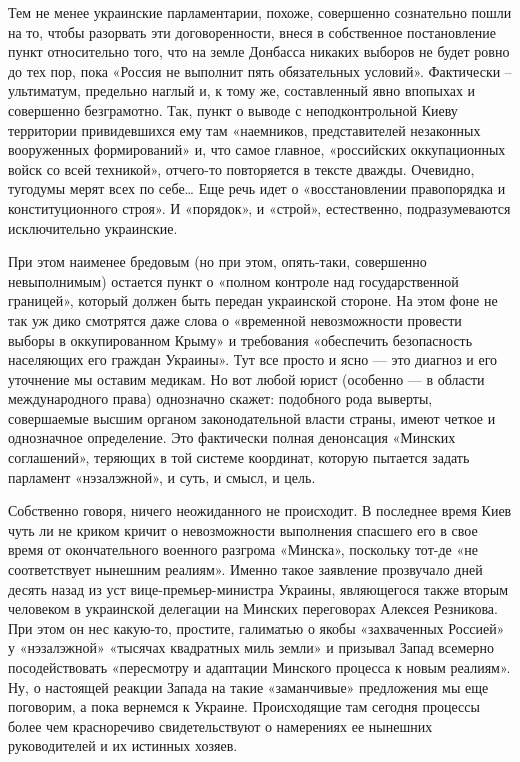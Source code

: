 Тем не менее украинские парламентарии, похоже, совершенно сознательно пошли на
то, чтобы разорвать эти договоренности, внеся в собственное постановление пункт
относительно того, что на земле Донбасса никаких выборов не будет ровно до тех
пор, пока «Россия не выполнит пять обязательных условий». Фактически –
ультиматум, предельно наглый и, к тому же, составленный явно впопыхах и
совершенно безграмотно. Так, пункт о выводе с неподконтрольной Киеву территории
привидевшихся ему там «наемников, представителей незаконных вооруженных
формирований» и, что самое главное, «российских оккупационных войск со всей
техникой», отчего-то повторяется в тексте дважды. Очевидно, тугодумы мерят всех
по себе… Еще речь идет о «восстановлении правопорядка и конституционного
строя». И «порядок», и «строй», естественно, подразумеваются исключительно
украинские.

При этом наименее бредовым (но при этом, опять-таки, совершенно невыполнимым) остается пункт о «полном контроле над государственной границей», который должен быть передан украинской стороне. На этом фоне не так уж дико смотрятся даже слова о «временной невозможности провести выборы в оккупированном Крыму» и требования «обеспечить безопасность населяющих его граждан Украины». Тут все просто и ясно --- это диагноз и его уточнение мы оставим медикам. Но вот любой юрист (особенно --- в области международного права) однозначно скажет: подобного рода выверты, совершаемые высшим органом законодательной власти страны, имеют четкое и однозначное определение. Это фактически полная денонсация «Минских соглашений», теряющих в той системе координат, которую пытается задать парламент «нэзалэжной», и суть, и смысл, и цель.

Собственно говоря, ничего неожиданного не происходит. В последнее время Киев чуть ли не криком кричит о невозможности выполнения спасшего его в свое время от окончательного военного разгрома «Минска», поскольку тот-де «не соответствует нынешним реалиям». Именно такое заявление прозвучало дней десять назад из уст вице-премьер-министра Украины, являющегося также вторым человеком в украинской делегации на Минских переговорах Алексея Резникова. При этом он нес какую-то, простите, галиматью о якобы «захваченных Россией» у «нэзалэжной» «тысячах квадратных миль земли» и призывал Запад всемерно посодействовать «пересмотру и адаптации Минского процесса к новым реалиям». Ну, о настоящей реакции Запада на такие «заманчивые» предложения мы еще поговорим, а пока вернемся к Украине. Происходящие там сегодня процессы более чем красноречиво свидетельствуют о намерениях ее нынешних руководителей и их истинных хозяев.

